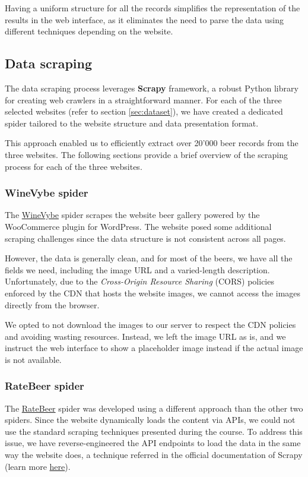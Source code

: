 Having a uniform structure for all the records simplifies the representation of the results in the web interface, as it eliminates the need to parse the data using different techniques depending on the website.

\subsection{Data scraping}
\label{sec:data-scraping}

The data scraping process leverages \textbf{Scrapy} framework, a robust Python library for creating web crawlers in a straightforward manner. For each of the three selected websites (refer to section \ref{sec:dataset}), we have created a dedicated spider tailored to the website structure and data presentation format.

This approach enabled us to efficiently extract over 20'000 beer records from the three websites. The following sections provide a brief overview of the scraping process for each of the three websites.

\subsubsection{WineVybe spider}

The \href{https://winevybe.com/}{WineVybe} spider scrapes the website beer gallery powered by the WooCommerce plugin for WordPress. The website posed some additional scraping challenges since the data structure is not consistent across all pages.

However, the data is generally clean, and for most of the beers, we have all the fields we need, including the image URL and a varied-length description. Unfortunately, due to the \textit{Cross-Origin Resource Sharing} (CORS) policies enforced by the CDN that hosts the website images, we cannot access the images directly from the browser.

We opted to not download the images to our server to respect the CDN policies and avoiding wasting resources. Instead, we left the image URL as is, and we instruct the web interface to show a placeholder image instead if the actual image is not available.

\subsubsection{RateBeer spider}

The \href{https://www.ratebeer.com/}{RateBeer} spider was developed using a different approach than the other two spiders. Since the website dynamically loads the content via APIs, we could not use the standard scraping techniques presented during the course. To address this issue, we have reverse-engineered the API endpoints to load the data in the same way the website does, a technique referred in the official documentation of Scrapy (learn more \href{https://docs.scrapy.org/en/latest/topics/dynamic-content.html}{here}).

